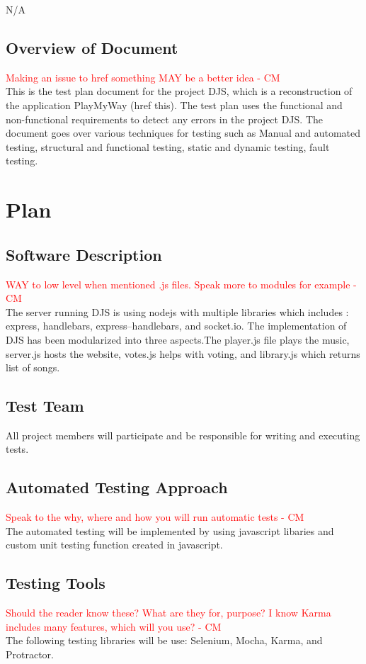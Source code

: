 \documentclass[12pt, titlepage]{article}
\begin{document}
N/A

\subsection{Overview of Document}
\textcolor{red}{Making an issue to href something MAY be a better idea - CM} \\
	This is the test plan document for the project DJS, which is a reconstruction of the application PlayMyWay (href this).
The test plan uses the functional and non-functional requirements to detect any errors in the project DJS.
The document goes over various techniques for testing such as Manual and automated testing, structural and
functional testing, static and dynamic testing, fault testing.

\section{Plan}
	
\subsection{Software Description}
\textcolor{red}{WAY to low level when mentioned .js files. Speak more to modules for example - CM} \\
The server running DJS is using nodejs with multiple libraries which includes : express, handlebars, express--handlebars, and socket.io. The implementation of DJS has been modularized into three aspects.The player.js file plays the music, server.js hosts the website, votes.js helps with voting, and library.js which returns list of songs. 

\subsection{Test Team}
All project members will participate and be responsible for writing and executing tests.

\subsection{Automated Testing Approach}
\textcolor{red}{Speak to the why, where and how you will run automatic tests - CM} \\
The automated testing will be implemented by using javascript libaries and custom unit testing function created in javascript.
\subsection{Testing Tools}
\textcolor{red}{Should the reader know these? What are they for, purpose? I know Karma includes many features, which will you use? - CM} \\
The following testing libraries will be use: Selenium, Mocha, Karma, and Protractor. 
\end{document}
